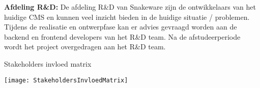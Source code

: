 \whitespace
\textbf{Afdeling R\&D:} De afdeling R\&D van Snakeware zijn de ontwikkelaars van het huidige \gls{CMS} en kunnen veel inzicht bieden in de huidige situatie / problemen.
Tijdens de realisatie en ontwerpfase kan er advies gevraagd worden aan de backend en frontend developers van het R\&D team.
Na de afstudeerperiode wordt het project overgedragen aan het R\&D team.
%
%

\whitespace
\begin{graphic}
    \captionsetup{type=figure}
    \caption{Stakeholders invloed matrix}
    \texttt{[image: StakeholdersInvloedMatrix]}
    \label{fig:StakeholdersInvloedMatrix}
\end{graphic}

